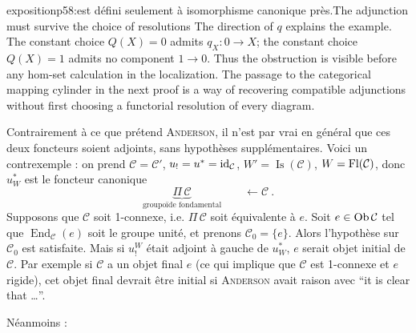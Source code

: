 \begin{dcomment}{exposition}{p58:est défini seulement à isomorphisme canonique près.}{The adjunction must survive the choice of resolutions}
The direction of $q$ explains the example. The constant choice $Q(X)=0$ admits $q_X:0\to X$; the constant choice $Q(X)=1$ admits no component $1\to0$. Thus the obstruction is visible before any hom-set calculation in the localization. The passage to the categorical mapping cylinder in the next proof is a way of recovering compatible adjunctions without first choosing a functorial resolution of every diagram.
\end{dcomment}


Contrairement à ce que prétend \textsc{Anderson}, il n'est par vrai en général que ces deux %
foncteurs soient adjoints, sans hypothèses supplémentaires. Voici un contrexemple : on prend $\mathcal{C} = \mathcal{C}'$, $u_! = u^* = \mathrm{id}_{\mathcal{C}}$, $W' = \operatorname{Is}(\mathcal{C})$, $W = \operatorname{Fl}(\mathcal{C})$, donc $u_W^*$ est le foncteur canonique
\[
\underbrace{\Pi\,\mathcal{C}}_{\text{groupoïde fondamental}} \qquad \longleftarrow \mathcal{C}\ .
\]
Supposons que $\mathcal{C}$ soit 1-connexe, i.e. $\Pi\,\mathcal{C}$ soit équivalente à $e$. Soit $e\in\operatorname{Ob}\mathcal{C}$ tel que $\operatorname{End}_{\mathcal{C}}(e)$ soit le groupe unité, et prenons $\mathcal{C}_0 = \{e\}$. Alors l'hypothèse sur $\mathcal{C}_0$ est satisfaite. Mais si $u_!^W$ était adjoint à gauche de $u_W^*$, $e$ serait objet initial de $\mathcal{C}$. Par exemple si $\mathcal{C}$ a un objet final $e$ (ce qui implique que $\mathcal{C}$ est 1-connexe et $e$ rigide), cet objet final devrait être initial si \textsc{Anderson} avait raison avec “it is clear that \ldots”.

Néanmoins :

